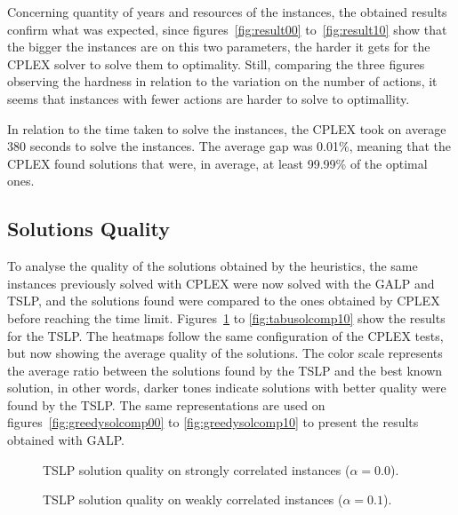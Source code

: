 Concerning quantity of years and resources of the instances, the obtained results confirm what was expected, since 
figures~\ref{fig:result00} to~\ref{fig:result10}
show that the bigger the instances are on this two parameters, the harder it gets for the CPLEX solver to solve them to optimality. 
Still, comparing the three figures observing the hardness in relation to the variation on the number of actions, it seems that instances with fewer actions are 
harder to solve to optimallity.

In relation to the time taken to solve the instances, the CPLEX took on average 380 seconds to solve the instances. The average gap was 
0.01\%, meaning that the CPLEX found solutions that were, in average, at least 99.99\% of the optimal ones.

\subsection{Solutions Quality}

To analyse the quality of the solutions obtained by the heuristics, the same instances previously solved with CPLEX were now solved with
the GALP and TSLP, and the solutions found were compared to the ones obtained by CPLEX before reaching the time limit. 
Figures~\ref{fig:tabusolcomp00} to \ref{fig:tabusolcomp10} show the results for the TSLP. The heatmaps follow the same configuration 
of the CPLEX tests, but now showing the average quality of the solutions. The color scale represents
the average ratio between the solutions found by the TSLP and the best known solution, in other words, darker tones indicate solutions
with better quality were found by the TSLP. The same representations are used on figures~\ref{fig:greedysolcomp00} to \ref{fig:greedysolcomp10} 
to present the results obtained with GALP.

\begin{figure}[H]
  \centering
  \resizebox{\columnwidth}{!}{%
    \subfloat[1 resource]{}
    \subfloat[2 resources]{}
    \subfloat[4 resources]{}
  }
  \caption{TSLP solution quality on strongly correlated instances ($\alpha = 0.0$).}
  \label{fig:tabusolcomp00}
\end{figure}

\begin{figure}[H]
  \centering
  \resizebox{\columnwidth}{!}{%
    \subfloat[1 resource]{}
    \subfloat[2 resources]{}
    \subfloat[4 resources]{}
  }
  \caption{TSLP solution quality on weakly correlated instances ($\alpha = 0.1$).}
  \label{fig:tabusolcomp01}
\end{figure}

